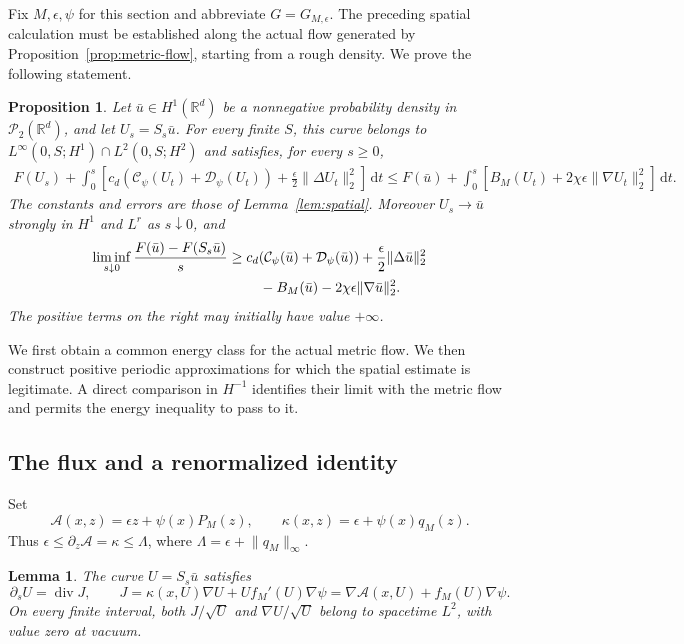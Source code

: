 \documentclass[11pt]{article}
\numberwithin{equation}{section}
\newtheorem{proposition}[theorem]{Proposition}
\newtheorem{lemma}[theorem]{Lemma}
\theoremstyle{definition}
\theoremstyle{remark}
\newcommand{\R}{\mathbb R}
\newcommand{\Ptwo}{\mathcal P_2(\R^d)}
\newcommand{\dd}{\,\mathrm d}
\newcommand{\Div}{\operatorname{div}}
\newcommand{\norm}[1]{\lVert #1\rVert}
\newcommand{\Cpsi}{\mathcal C_\psi}
\newcommand{\Dpsi}{\mathcal D_\psi}
\begin{document}
Fix $M,\epsilon,\psi$ for this section and abbreviate $G=G_{M,\epsilon}$.
The preceding spatial calculation must be established along the actual
flow generated by Proposition~\ref{prop:metric-flow}, starting from a rough
density. We prove the following statement.

\begin{proposition}\label{prop:auxiliary-energy}
Let $\bar u\in H^1(\R^d)$ be a nonnegative probability density in $\Ptwo$,
and let $U_s=S_s\bar u$. For every finite $S$, this curve belongs to
$L^\infty(0,S;H^1)\cap L^2(0,S;H^2)$ and satisfies, for every $s\ge0$,
\begin{align}\label{eq:aux-energy}
 F(U_s)+\int_0^s\left[c_d(\Cpsi(U_t)+\Dpsi(U_t))
                     +\frac\epsilon2\norm{\Delta U_t}_2^2\right]\dd t
 \le F(\bar u)+\int_0^s
       [B_M(U_t)+2\chi\epsilon\norm{\nabla U_t}_2^2]\dd t.
\end{align}
The constants and errors are those of Lemma~\ref{lem:spatial}.
Moreover $U_s\to\bar u$ strongly in $H^1$ and $L^r$ as $s\downarrow0$, and
\begin{align}\label{eq:initial-dissipation}
 \liminf_{s\downarrow0}\frac{F(\bar u)-F(S_s\bar u)}s
 &\ge c_d(\Cpsi(\bar u)+\Dpsi(\bar u))
       +\frac\epsilon2\norm{\Delta\bar u}_2^2\notag\\
 &\hspace{8mm}-B_M(\bar u)-2\chi\epsilon\norm{\nabla\bar u}_2^2.
\end{align}
The positive terms on the right may initially have value $+\infty$.
\end{proposition}

We first obtain a common energy class for the actual metric flow. We then
construct positive periodic approximations for which the spatial estimate
is legitimate. A direct comparison in $H^{-1}$ identifies their limit with
the metric flow and permits the energy inequality to pass to it.

\subsection{The flux and a renormalized identity}
Set
\begin{equation}\label{eq:A}
 \mathcal A(x,z)=\epsilon z+\psi(x)P_M(z),\qquad
 \kappa(x,z)=\epsilon+\psi(x)q_M(z).
\end{equation}
Thus $\epsilon\le\partial_z\mathcal A=\kappa\le\Lambda$,
where $\Lambda=\epsilon+\norm{q_M}_\infty$.

\begin{lemma}\label{lem:actual-flux}
The curve $U=S_s\bar u$ satisfies
\begin{equation}\label{eq:auxiliary-PDE}
 \partial_s U=\Div J,\qquad
 J=\kappa(x,U)\nabla U+Uf_M'(U)\nabla\psi
   =\nabla\mathcal A(x,U)+f_M(U)\nabla\psi.
\end{equation}
On every finite interval, both $J/\sqrt U$ and $\nabla U/\sqrt U$ belong
to spacetime $L^2$, with value zero at vacuum.
\end{lemma}
\end{document}
